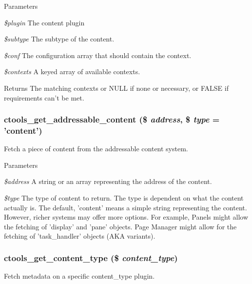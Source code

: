 \begin{DoxyParams}{Parameters}
\item[{\em \$plugin}]The content plugin \item[{\em \$subtype}]The subtype of the content. \item[{\em \$conf}]The configuration array that should contain the context. \item[{\em \$contexts}]A keyed array of available contexts.\end{DoxyParams}
\begin{DoxyReturn}{Returns}
The matching contexts or NULL if none or necessary, or FALSE if requirements can't be met. 
\end{DoxyReturn}
\hypertarget{content_8inc_a6fd8cc1103c59bb40d5ffcf8f3f1d06b}{
\subsubsection[{ctools\_\-get\_\-addressable\_\-content}]{\setlength{\rightskip}{0pt plus 5cm}ctools\_\-get\_\-addressable\_\-content (\$ {\em address}, \/  \$ {\em type} = {\ttfamily 'content'})}}
\label{content_8inc_a6fd8cc1103c59bb40d5ffcf8f3f1d06b}
Fetch a piece of content from the addressable content system.


\begin{DoxyParams}{Parameters}
\item[{\em \$address}]A string or an array representing the address of the content. \item[{\em \$type}]The type of content to return. The type is dependent on what the content actually is. The default, 'content' means a simple string representing the content. However, richer systems may offer more options. For example, Panels might allow the fetching of 'display' and 'pane' objects. Page Manager might allow for the fetching of 'task\_\-handler' objects (AKA variants). \end{DoxyParams}
\hypertarget{content_8inc_a41fa9354b9c05ff536e74913921739dd}{
\subsubsection[{ctools\_\-get\_\-content\_\-type}]{\setlength{\rightskip}{0pt plus 5cm}ctools\_\-get\_\-content\_\-type (\$ {\em content\_\-type})}}
\label{content_8inc_a41fa9354b9c05ff536e74913921739dd}
Fetch metadata on a specific content\_\-type plugin.


